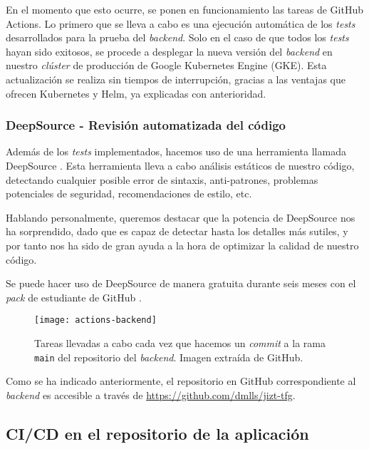 En el momento que esto ocurre, se ponen en funcionamiento las tareas de GitHub Actions. Lo primero que se lleva a cabo es una ejecución automática de los \emph{tests} desarrollados para la prueba del \emph{backend}. Solo en el caso de que todos los \emph{tests} hayan sido exitosos, se procede a desplegar la nueva versión del \emph{backend} en nuestro \emph{clúster} de producción de Google Kubernetes Engine (GKE). Esta actualización se realiza sin tiempos de interrupción, gracias a las ventajas que ofrecen Kubernetes y Helm, ya explicadas con anterioridad.

\newpage

\subsubsection{DeepSource - Revisión automatizada del código}

Además de los \emph{tests} implementados, hacemos uso de una herramienta llamada DeepSource \cite{deepsource}. Esta herramienta lleva a cabo análisis estáticos de nuestro código, detectando cualquier posible error de sintaxis, anti-patrones, problemas potenciales de seguridad, recomendaciones de estilo, etc.

Hablando personalmente, queremos destacar que la potencia de DeepSource nos ha sorprendido, dado que es capaz de detectar hasta los detalles más sutiles, y por tanto nos ha sido de gran ayuda a la hora de optimizar la calidad de nuestro código.

Se puede hacer uso de DeepSource de manera gratuita durante seis meses con el \emph{pack} de estudiante de GitHub \cite{gh-student-pack}.

\smallskip

\begin{figure}[h!]
	\centering
	\texttt{[image: actions-backend]}
	\caption[GitHub Actions en el \emph{backend}.]{Tareas llevadas a cabo cada vez que hacemos un \emph{commit} a la rama \texttt{main} del repositorio del \emph{backend}. Imagen extraída de GitHub.}
\end{figure}

Como se ha indicado anteriormente, el repositorio en GitHub correspondiente al \emph{backend} es accesible a través de \href{https://github.com/dmlls/jizt-tfg}{https://github.com/dmlls/jizt-tfg}.

\subsection{CI/CD en el repositorio de la aplicación} \label{subsec:ci-cd-app}

